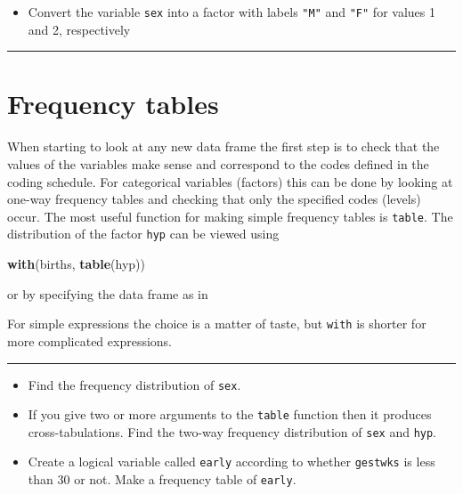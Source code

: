 \documentclass[
]{book}
\newenvironment{Shaded}{\begin{snugshade}}{\end{snugshade}}
\newcommand{\FunctionTok}[1]{\textcolor[rgb]{0.13,0.29,0.53}{\textbf{#1}}}
\newcommand{\NormalTok}[1]{#1}
\newcommand{\SpecialCharTok}[1]{\textcolor[rgb]{0.81,0.36,0.00}{\textbf{#1}}}
\providecommand{\tightlist}{%
  \setlength{\itemsep}{0pt}\setlength{\parskip}{0pt}}
\begin{document}
\begin{itemize}
\tightlist
\item
  Convert the variable \texttt{sex} into a factor
  with labels \texttt{"M"} and \texttt{"F"} for values 1 and 2, respectively
\end{itemize}

\begin{center}\rule{0.5\linewidth}{0.5pt}\end{center}

\section{Frequency tables}\label{frequency-tables}

When starting to look at any new data frame the first step is to check
that the values of the variables make sense and correspond to the
codes defined in the coding schedule. For categorical variables
(factors) this can be done by looking at one-way frequency tables and
checking that only the specified codes (levels) occur. The most
useful function for making simple frequency tables is \texttt{table}.
The distribution of the factor \texttt{hyp} can be viewed using

\begin{Shaded}
\begin{Highlighting}[]
\FunctionTok{with}\NormalTok{(births, }\FunctionTok{table}\NormalTok{(hyp))}
\end{Highlighting}
\end{Shaded}

or by specifying the data frame as in

\begin{Shaded}
\end{Shaded}

For simple expressions the choice is a matter of taste, but \texttt{with}
is shorter for more complicated expressions.

\begin{center}\rule{0.5\linewidth}{0.5pt}\end{center}

\begin{itemize}
\item
  Find the frequency distribution of \texttt{sex}.
\item
  If you give two or more arguments to the \texttt{table} function
  then it produces cross-tabulations. Find the two-way frequency
  distribution of \texttt{sex} and \texttt{hyp}.
\item
  Create a logical variable called \texttt{early}
  according to whether \texttt{gestwks} is less than 30 or not. Make a frequency table of \texttt{early}.
\end{itemize}
\end{document}
